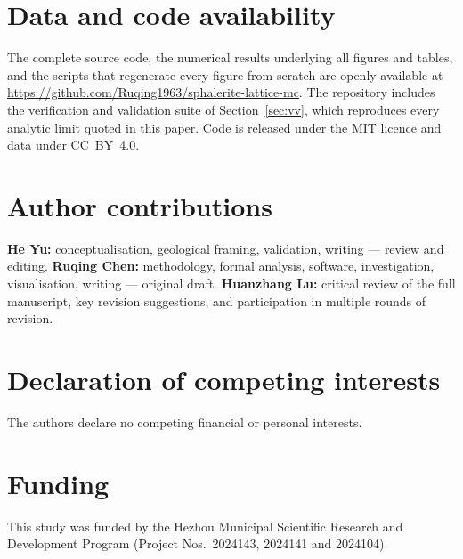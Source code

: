 \documentclass[11pt,a4paper]{article}
\begin{document}
\section*{Data and code availability}

The complete source code, the numerical results underlying all figures and
tables, and the scripts that regenerate every figure from scratch are openly
available at
\url{https://github.com/Ruqing1963/sphalerite-lattice-mc}. The repository
includes the verification and validation suite of Section~\ref{sec:vv}, which
reproduces every analytic limit quoted in this paper. Code is released under the
MIT licence and data under CC~BY~4.0.

\section*{Author contributions}

\textbf{He Yu:} conceptualisation, geological framing, validation, writing ---
review and editing. \textbf{Ruqing Chen:} methodology, formal analysis,
software, investigation, visualisation, writing --- original draft.
\textbf{Huanzhang Lu:} critical review of the full manuscript, key
revision suggestions, and participation in multiple rounds of revision.

\section*{Declaration of competing interests}

The authors declare no competing financial or personal interests.

\section*{Funding}

This study was funded by the Hezhou Municipal Scientific Research and
Development Program (Project Nos.\ 2024143, 2024141 and 2024104).
\end{document}
